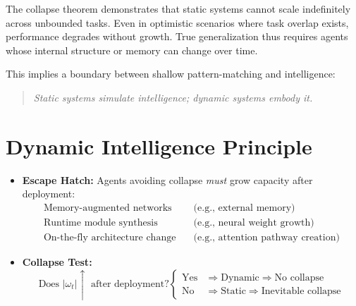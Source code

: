 \documentclass{article}
\begin{document}
The collapse theorem demonstrates that static systems cannot scale indefinitely across unbounded tasks. Even in optimistic scenarios where task overlap exists, performance degrades without growth. True generalization thus requires agents whose internal structure or memory can change over time.

This implies a boundary between shallow pattern-matching and intelligence:
\begin{quote}
\textit{Static systems simulate intelligence; dynamic systems embody it.}
\end{quote}
\section{Dynamic Intelligence Principle}
\begin{itemize}
  \item \textbf{Escape Hatch:} Agents avoiding collapse \textit{must} grow capacity after deployment:
  \begin{align*}
    \text{Memory-augmented networks}  &\quad \text{(e.g., external memory)} \\
    \text{Runtime module synthesis}   &\quad \text{(e.g., neural weight growth)} \\
    \text{On-the-fly architecture change} &\quad \text{(e.g., attention pathway creation)}
  \end{align*}
  
  \item \textbf{Collapse Test:} 
  \[
  \text{Does } |\omega_t| \uparrow \text{ after deployment?} 
  \begin{cases} 
    \text{Yes} & \Rightarrow \text{Dynamic} \Rightarrow \text{No collapse} \\
    \text{No}  & \Rightarrow \text{Static} \Rightarrow \text{Inevitable collapse}
  \end{cases}
  \]
\end{itemize}
\end{document}
